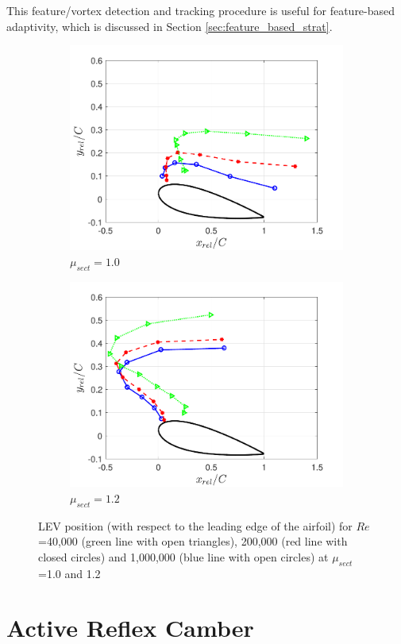 This feature/vortex detection and tracking procedure is useful for feature-based adaptivity, which is discussed in Section \ref{sec:feature_based_strat}.


\begin{figure}[H]
	\begin{subfigure}{0.5\textwidth}
		\includegraphics[width=1\textwidth]{figures/LEV_location_lambda_1pt0}
		\caption{$\mu_{sect} = 1.0$}
		\label{fig:LEV_location_lambda_1p0}
	\end{subfigure}
	\begin{subfigure}{0.5\textwidth}
		\includegraphics[width=1\textwidth]{figures/LEV_location_lambda_1pt2}
		\caption{$\mu_{sect} = 1.2$}
		\label{fig:LEV_location_lambda_1p2}
	\end{subfigure}
 	\caption{LEV position (with respect to the leading edge of the airfoil) for $Re$=40,000 (green line with open triangles), 200,000 (red line with closed circles) and 1,000,000 (blue line with open circles) at $\mu_{sect}$=1.0 and 1.2}
	\label{fig:LEV_location_LE_airfoil}
\end{figure}

\section{Active Reflex Camber}



